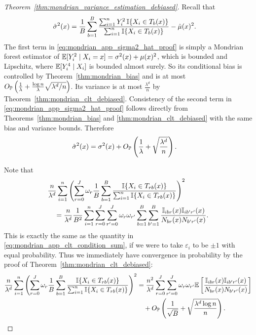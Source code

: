 \begin{proof}[Theorem~\ref{thm:mondrian_variance_estimation_debiased}]


  Recall that
  \begin{align}
    \label{eq:mondrian_app_sigma2_hat_proof}
    \hat\sigma^2(x)
    &=
    \frac{1}{B}
    \sum_{b=1}^{B}
    \frac{\sum_{i=1}^n Y_i^2 \, \I\{X_i \in T_b(x)\}}
    {\sum_{i=1}^n \I\{X_i \in T_b(x)\}}
    - \hat \mu(x)^2.
  \end{align}
  The first term in \eqref{eq:mondrian_app_sigma2_hat_proof}
  is simply a Mondrian forest estimator of
  $\E[Y_i^2 \mid X_i = x] = \sigma^2(x) + \mu(x)^2$,
  which is bounded and Lipschitz,
  where $\E[Y_i^4 \mid X_i]$ is bounded almost surely.
  So its conditional bias is controlled
  by Theorem~\ref{thm:mondrian_bias} and is at most
  $O_\P \left( \frac{1}{\lambda} +
  \frac{\log n}{\lambda} \sqrt{\lambda^d / n} \right)$.
  Its variance is
  at most $\frac{\lambda^d}{n}$ by Theorem~\ref{thm:mondrian_clt_debiased}.
  Consistency of the second term in \eqref{eq:mondrian_app_sigma2_hat_proof}
  follows directly from Theorems~\ref{thm:mondrian_bias} and
  \ref{thm:mondrian_clt_debiased} with the same bias and variance bounds.
  Therefore
  \begin{align*}
    \hat\sigma^2(x)
    &=
    \sigma^2(x)
    + O_\P \left(
      \frac{1}{\lambda}
      + \sqrt{\frac{\lambda^d}{n}}
    \right).
  \end{align*}

  Note that
  \begin{align*}
    &\frac{n}{\lambda^d}
    \sum_{i=1}^n
    \left(
      \sum_{r=0}^J
      \omega_r
      \frac{1}{B}
      \sum_{b=1}^B
      \frac{\I\{X_i \in T_{r b}(x)\}}
      {\sum_{i=1}^n \I\{X_i \in T_{r b}(x)\}}
    \right)^2 \\
    &\quad=
    \frac{n}{\lambda^d}
    \frac{1}{B^2}
    \sum_{i=1}^n
    \sum_{r=0}^J
    \sum_{r'=0}^J
    \omega_r
    \omega_{r'}
    \sum_{b=1}^B
    \sum_{b'=1}^B
    \frac{\I_{i b r}(x) \I_{i b' r'}(x)}
    {N_{b r}(x) N_{b' r'}(x)}.
  \end{align*}
  This is exactly the same as the quantity in
  \eqref{eq:mondrian_app_clt_condition_sum}, if we were to take
  $\varepsilon_i$ to be $\pm 1$ with equal probability.
  Thus we immediately have convergence in probability
  by the proof of Theorem~\ref{thm:mondrian_clt_debiased}:
  \begin{align*}
    \frac{n}{\lambda^d}
    \sum_{i=1}^n
    \left(
      \sum_{r=0}^J
      \omega_r
      \frac{1}{B}
      \sum_{b=1}^B
      \frac{\I\{X_i \in T_{r b}(x)\}}
      {\sum_{i=1}^n \I\{X_i \in T_{r b}(x)\}}
    \right)^2
    &=
    \frac{n^2}{\lambda^d}
    \sum_{r=0}^J
    \sum_{r'=0}^J
    \omega_r
    \omega_{r'}
    \E \left[
      \frac{\I_{i b r}(x) \I_{i b' r'}(x)}
      {N_{b r}(x) N_{b' r'}(x)}
    \right] \\
    &\quad+
    O_\P \left(
      \frac{1}{\sqrt B}
      + \sqrt{\frac{\lambda^d \log n}{n}}
    \right).
  \end{align*}


\end{proof}
